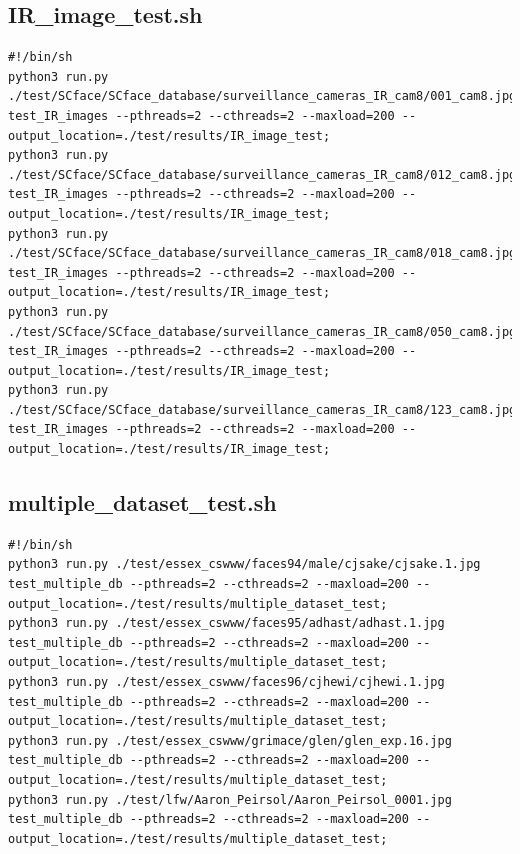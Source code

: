 \documentclass[12pt]{article}
\begin{document}
\begin{appendices}
\subsection{IR\_image\_test.sh}
\begin{lstlisting}
#!/bin/sh
python3 run.py ./test/SCface/SCface_database/surveillance_cameras_IR_cam8/001_cam8.jpg test_IR_images --pthreads=2 --cthreads=2 --maxload=200 --output_location=./test/results/IR_image_test;
python3 run.py ./test/SCface/SCface_database/surveillance_cameras_IR_cam8/012_cam8.jpg test_IR_images --pthreads=2 --cthreads=2 --maxload=200 --output_location=./test/results/IR_image_test;
python3 run.py ./test/SCface/SCface_database/surveillance_cameras_IR_cam8/018_cam8.jpg test_IR_images --pthreads=2 --cthreads=2 --maxload=200 --output_location=./test/results/IR_image_test;
python3 run.py ./test/SCface/SCface_database/surveillance_cameras_IR_cam8/050_cam8.jpg test_IR_images --pthreads=2 --cthreads=2 --maxload=200 --output_location=./test/results/IR_image_test;
python3 run.py ./test/SCface/SCface_database/surveillance_cameras_IR_cam8/123_cam8.jpg test_IR_images --pthreads=2 --cthreads=2 --maxload=200 --output_location=./test/results/IR_image_test;
\end{lstlisting}

\subsection{multiple\_dataset\_test.sh}
\begin{lstlisting}
#!/bin/sh
python3 run.py ./test/essex_cswww/faces94/male/cjsake/cjsake.1.jpg test_multiple_db --pthreads=2 --cthreads=2 --maxload=200 --output_location=./test/results/multiple_dataset_test;
python3 run.py ./test/essex_cswww/faces95/adhast/adhast.1.jpg test_multiple_db --pthreads=2 --cthreads=2 --maxload=200 --output_location=./test/results/multiple_dataset_test;
python3 run.py ./test/essex_cswww/faces96/cjhewi/cjhewi.1.jpg test_multiple_db --pthreads=2 --cthreads=2 --maxload=200 --output_location=./test/results/multiple_dataset_test;
python3 run.py ./test/essex_cswww/grimace/glen/glen_exp.16.jpg test_multiple_db --pthreads=2 --cthreads=2 --maxload=200 --output_location=./test/results/multiple_dataset_test;
python3 run.py ./test/lfw/Aaron_Peirsol/Aaron_Peirsol_0001.jpg test_multiple_db --pthreads=2 --cthreads=2 --maxload=200 --output_location=./test/results/multiple_dataset_test;
\end{lstlisting}
\end{appendices}
\end{document}
